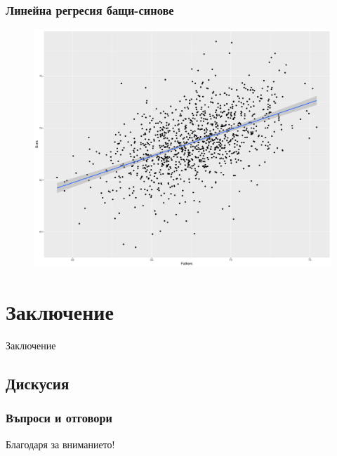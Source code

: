 \documentclass{beamer}
\begin{document}
\begin{frame}
\frametitle{Линейна регресия бащи-синове}
\begin{figure}[]\includegraphics[width=\textwidth,height=0.75\textheight]{pic0059}\end{figure}
\end{frame}

\section{Заключение}

\begin{frame}
\center \huge{Заключение}
\end{frame}

\subsection{Дискусия}

\begin{frame}
\frametitle{Въпроси и отговори}
\center \huge{Благодаря за вниманието!}
\end{frame}
\end{document}
